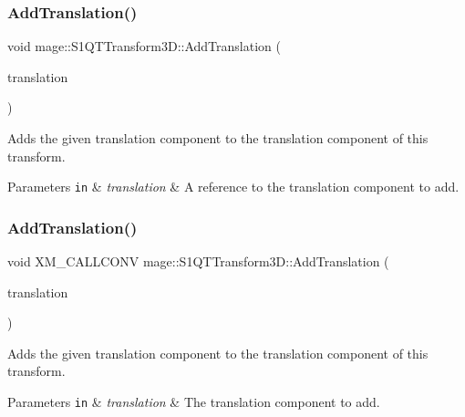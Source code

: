 \subsubsection{\texorpdfstring{Add\+Translation()}{AddTranslation()}\hspace{0.1cm}{\footnotesize\ttfamily [2/3]}}
{\footnotesize\ttfamily void mage\+::\+S1\+Q\+T\+Transform3\+D\+::\+Add\+Translation (\begin{DoxyParamCaption}\item[{const \mbox{\hyperlink{namespacemage_a1e3c7a882af461f161caa1cbddaf1fa2}{F32x3}} \&}]{translation }\end{DoxyParamCaption})\hspace{0.3cm}{\ttfamily [noexcept]}}

Adds the given translation component to the translation component of this transform.


\begin{DoxyParams}[1]{Parameters}
\mbox{\tt in}  & {\em translation} & A reference to the translation component to add. \\
\hline
\end{DoxyParams}
\mbox{\label{classmage_1_1_s1_q_t_transform3_d_a61ef9b65abd3cc2b264c00cdb3f1ca9d}} 
\subsubsection{\texorpdfstring{Add\+Translation()}{AddTranslation()}\hspace{0.1cm}{\footnotesize\ttfamily [3/3]}}
{\footnotesize\ttfamily void X\+M\+\_\+\+C\+A\+L\+L\+C\+O\+NV mage\+::\+S1\+Q\+T\+Transform3\+D\+::\+Add\+Translation (\begin{DoxyParamCaption}\item[{F\+X\+M\+V\+E\+C\+T\+OR}]{translation }\end{DoxyParamCaption})\hspace{0.3cm}{\ttfamily [noexcept]}}

Adds the given translation component to the translation component of this transform.


\begin{DoxyParams}[1]{Parameters}
\mbox{\tt in}  & {\em translation} & The translation component to add. \\
\hline
\end{DoxyParams}
\mbox{\label{classmage_1_1_s1_q_t_transform3_d_aa5663a5df10e4c37a16ffd634d847224}} 

